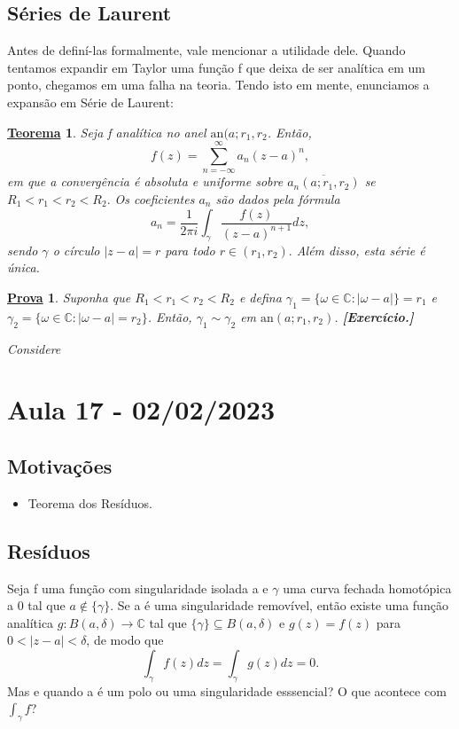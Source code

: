 \documentclass{article}
\newtheorem*{theorem*}{\underline{Teorema}}
\newtheorem*{proof*}{\underline{Prova}}
\begin{document}
\subsection{Séries de Laurent}
  Antes de definí-las formalmente, vale mencionar a utilidade dele. Quando tentamos expandir em Taylor uma função f que 
deixa de ser analítica em um ponto, chegamos em uma falha na teoria. Tendo isto em mente, enunciamos a expansão em Série de Laurent:
\hypertarget{laurent}{
\begin{theorem*}
  Seja f analítica no anel \(\mathrm{an}(a; r_{1}, r_{2}\). Então,
    \[
      f(z) = \sum\limits_{n=-\infty}^{\infty}a_{n}(z-a)^{n},
    \]
  em que a convergência é absoluta e uniforme sobre \(\overline{a_{n}(a; r_{1}, r_{2})}\) se 
 \(R_{1} < r_{1} < r_{2} < R_{2}.\) Os coeficientes \(a_{n}\) são dados pela fórmula 
   \[
     a_{n} = \frac{1}{2\pi i}\int_{\gamma }^{}\frac{f(z)}{(z-a)^{n+1}}dz,
   \]
  sendo \(\gamma \) o círculo \(|z-a|=r\) para todo \(r\in (r_{1}, r_{2}).\) Além disso, esta série é única.
\end{theorem*}}
\begin{proof*}
  Suponha que \(R_{1} < r_{1} < r_{2} < R_{2}\) e defina \(\gamma_{1} = \{\omega \in \mathbb{C}:|\omega -a|\} = r_{1}\) e \(\gamma_{2} = \{\omega \in \mathbb{C}:|\omega -a|=r_{2}\}\).
Então, \(\gamma_{1}\sim \gamma _{2}\) em \(\mathrm{an}(a; r_{1}, r_{2})\). \textbf{[Exercício.]}

  Considere 
\end{proof*}
  \newpage

  \section{Aula 17 - 02/02/2023}
  \subsection{Motivações} 
  \begin{itemize}
    \item Teorema dos Resíduos.
  \end{itemize}
  \subsection{Resíduos}
    Seja f uma função com singularidade isolada a e \(\gamma \) uma curva fechada homotópica a 0 tal que \(a\not\in\{\gamma \}.\)
  Se a é uma singularidade removível, então existe uma função analítica \(g:B(a, \delta )\rightarrow \mathbb{C}\) tal que 
  \(\{\gamma \}\subseteq B(a, \delta )\) e \(g(z) = f(z)\) para \(0 < |z-a| < \delta \), de modo que 
    \[
      \int_{\gamma }^{}f(z)dz = \int_{\gamma }^{}g(z)dz = 0.
    \]
  Mas e quando a é um polo ou uma singularidade esssencial? O que acontece com \(\int_{\gamma }^{}f\)?
\end{document}
